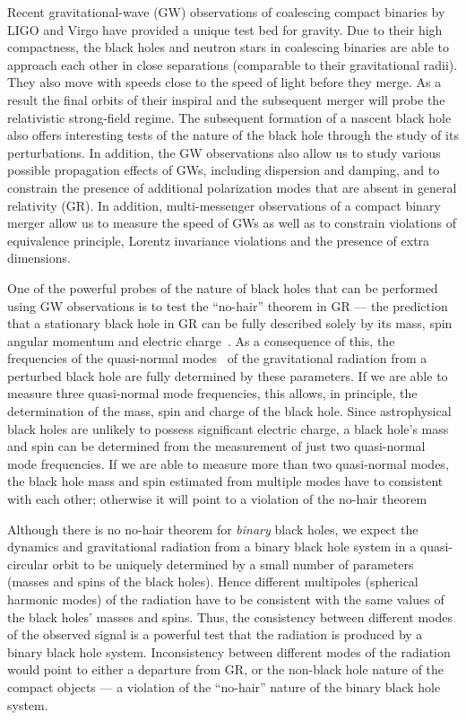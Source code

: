 \documentclass[prd,preprintnumbers,twocolumn,eqsecnum,floatfix,a4paper,nofootinbib,superscriptaddress]{revtex4}
\begin{document}
Recent gravitational-wave (GW) observations of coalescing compact binaries by LIGO and Virgo have provided a unique test bed for gravity. Due to their high compactness, the black holes and neutron stars in coalescing binaries are able to approach each other in close separations (comparable to their gravitational radii). They also move with speeds close to the speed of light before they merge. As a result the final orbits of their inspiral and the subsequent merger will probe the relativistic strong-field regime. The subsequent formation of a nascent black hole also offers interesting tests of the nature of the black hole through the study of its perturbations. In addition, the GW observations also allow us to study various possible propagation effects of GWs, including dispersion and damping, and to constrain the presence of additional polarization modes that are absent in general relativity (GR). In addition, multi-messenger observations of a compact binary merger allow us to measure the speed of GWs as well as to constrain violations of equivalence principle, Lorentz invariance violations and the presence of extra dimensions. 

One of the powerful probes of the nature of black holes that can be performed using GW observations is to test the ``no-hair'' theorem in GR --- the prediction that a stationary black hole in GR can be fully described solely by its mass, spin angular momentum and electric charge~\cite{Israel:1967,Israel:1968,Carter:1978}. As a consequence of this, the frequencies of the {quasi-normal modes}~\cite{Vishveshwara:1970zz,Press:1971wr,Chandrasekhar:1975zza} of the gravitational radiation from a perturbed black hole are fully determined by these parameters. If we are able to measure three quasi-normal mode frequencies, this allows, in principle, the determination of the mass, spin and charge of the black hole. Since astrophysical black holes are unlikely to possess significant electric charge, a black hole's mass and spin can be determined from the measurement of just two quasi-normal mode frequencies. If we are able to measure more than two quasi-normal modes, the black hole mass and spin estimated from multiple modes have to consistent with each other; otherwise it will point to a violation of the no-hair theorem~\cite{Dreyer:2003bv}

Although there is no no-hair theorem for \emph{binary} black holes, we expect the dynamics and gravitational radiation from a binary black hole system in a quasi-circular orbit to be uniquely determined by a small number of parameters (masses and spins of the black holes). Hence different multipoles (spherical harmonic modes) of the radiation have to be consistent with the same values of the black holes' masses and spins. Thus, the consistency between different modes of the observed signal is a powerful test that the radiation is produced by a binary black hole system. Inconsistency between different modes of the radiation would point to either a departure from GR, or the non-black hole nature of the compact objects --- a violation of the ``no-hair'' nature of the binary black hole system. 
\end{document}

